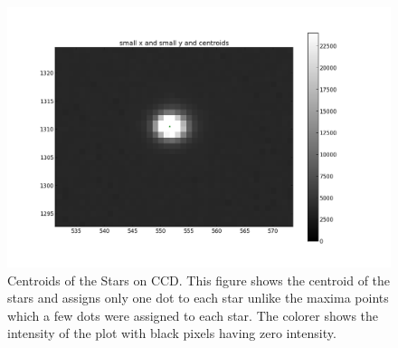 \documentclass[letterpaper,12pt]{article}
\begin{document}
\begin{figure}[h!]
                                                                                                                                                                                                                                                                                                                                                                                                                                                                                                                                                                                                                                                                                                                                                                                                                                                                                                                                                                                                                                                                                  \end{figure}   


\FloatBarrier
\begin{figure}[h!]
\centering
\includegraphics[scale=0.5]{centroid.png}
\caption{Centroids of the Stars on CCD. This figure shows the centroid of the stars and assigns only one dot to each star unlike the maxima points which a few dots were assigned to each star. The colorer shows the intensity of the plot with black pixels having zero intensity.}
\end{figure}
\FloatBarrier
 
\end{document}
